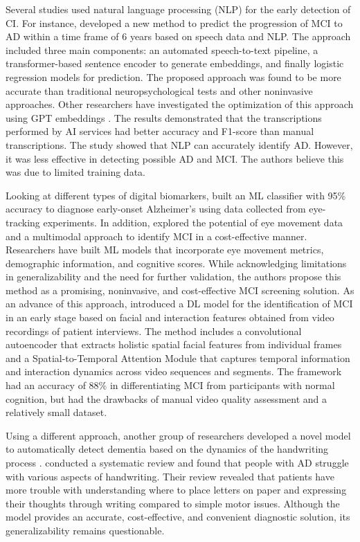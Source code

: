 Several studies used natural language processing (\acrshort{NLP}) for the early detection of CI. For instance,  developed a new method to predict the progression of MCI to AD within a time frame of 6 years based on speech data and NLP. The approach included three main components: an automated speech-to-text pipeline, a transformer-based sentence encoder to generate embeddings, and finally logistic regression models for prediction. The proposed approach was found to be more accurate than traditional neuropsychological tests and other noninvasive approaches. Other researchers have investigated the optimization of this approach using GPT embeddings \cite{Runde2024Optimization}. The results demonstrated that the transcriptions performed by AI services had better accuracy and F1-score than manual transcriptions. The study showed that NLP can accurately identify AD. However, it was less effective in detecting possible AD and MCI. The authors believe this was due to limited training data.

Looking at different types of digital biomarkers,  built an ML classifier with 95\% accuracy to diagnose early-onset Alzheimer’s using data collected from eye-tracking experiments. In addition,  explored the potential of eye movement data and a multimodal approach to identify MCI in a cost-effective manner. Researchers have built ML models that incorporate eye movement metrics, demographic information, and cognitive scores. While acknowledging limitations in generalizability and the need for further validation, the authors propose this method as a promising, noninvasive, and cost-effective MCI screening solution. As an advance of this approach,  introduced a DL model for the identification of MCI in an early stage based on facial and interaction features obtained from video recordings of patient interviews. The method includes a convolutional autoencoder that extracts holistic spatial facial features from individual frames and a Spatial-to-Temporal Attention Module that captures temporal information and interaction dynamics across video sequences and segments. The framework had an accuracy of 88\% in differentiating MCI from participants with normal cognition, but had the drawbacks of manual video quality assessment and a relatively small dataset.

Using a different approach, another group of researchers developed a novel model to automatically detect dementia based on the dynamics of the handwriting process \cite{Angelillo2019Attentional}.  conducted a systematic review and found that people with AD struggle with various aspects of handwriting. Their review revealed that patients have more trouble with understanding where to place letters on paper and expressing their thoughts through writing compared to simple motor issues. Although the model provides an accurate, cost-effective, and convenient diagnostic solution, its generalizability remains questionable.

